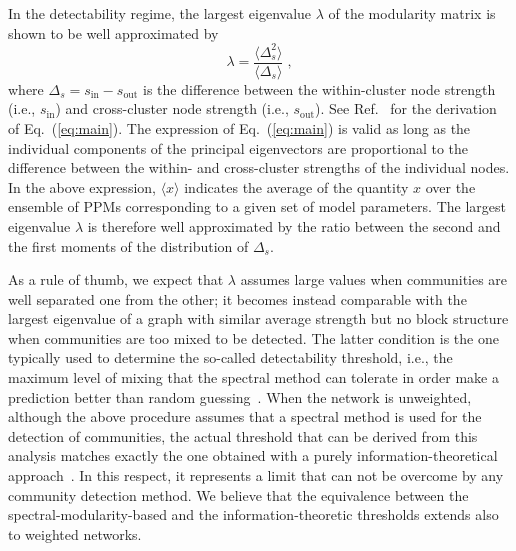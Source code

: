 \documentclass[a4paper,pre,superscriptaddress,floatfix,nofootinbib,twocolumn]{revtex4-1}
\begin{document}
In the detectability regime, the largest eigenvalue $\lambda$ of the modularity matrix is shown to be well approximated by
\begin{equation}
\lambda = \frac{\langle \Delta_{s}^2 \rangle}{\langle \Delta_{s} \rangle} \; ,
\label{eq:main}
\end{equation}
where $\Delta_{s}=s_\text{in} - s_\text{out}$ is the difference between the within-cluster node strength (i.e., $s_\text{in}$)
and cross-cluster node strength (i.e., $s_\text{out}$).
See Ref.~\cite{radicchi2013detectability} for the derivation of Eq.~(\ref{eq:main}).
The expression of Eq.~(\ref{eq:main}) is valid as long as the individual components of the principal eigenvectors are
proportional to the difference between the within- and cross-cluster strengths of the individual nodes.
In the above expression,
$\langle x \rangle$ indicates the average of the quantity $x$ over the ensemble of PPMs corresponding to a given set of model parameters. The largest eigenvalue $\lambda$ is therefore well approximated by the ratio between the second and the first moments of the distribution of $\Delta_{s}$.


As a rule of thumb, we expect that $\lambda$ assumes large values when communities are well separated one from the other; it becomes instead comparable with the largest eigenvalue of a graph with similar average strength but no block structure when communities are too mixed to be detected. The latter condition is the one typically used to determine the so-called detectability threshold, i.e., the maximum level of mixing that the spectral method can tolerate in order make a prediction better than random guessing~\cite{nadakuditi2012graph}. When the network is unweighted, although the above procedure assumes that a spectral method  is used for the detection of communities, the actual threshold that can be derived from this analysis matches exactly the one obtained with a purely information-theoretical approach~\cite{abbe2015community}. In this respect, it represents a limit that can not be overcome by any community detection method. We believe that the equivalence between the spectral-modularity-based  and the information-theoretic thresholds extends also to weighted networks.
\end{document}
